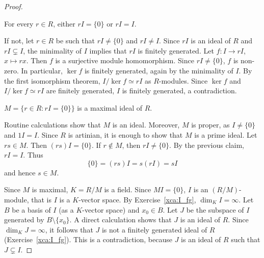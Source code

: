 \begin{graybox}
\begin{proof}
    \begin{claim}
		For every $r\in R$, either $rI=\{0\}$ or $rI=I$.
    \end{claim}
    
    If not, let $r\in R$ be such that $rI\ne\{0\}$ and $rI\ne I$. 
    Since $rI$ is an ideal of $R$ and
    $rI\subsetneq I$, the minimality of $I$ implies that 
    $rI$ is finitely generated. Let 
    $f\colon I\to rI$, $x\mapsto rx$. Then $f$ is a 
    surjective module homomorphism. Since $rI\ne\{0\}$, 
    $f$ is non-zero. In particular, $\ker f$ 
    is finitely generated, again by the minimality of $I$. 
    By the first isomorphism theorem, $I/\ker f\simeq rI$ as $R$-modules.
    Since $\ker f$ and $I/\ker f\simeq rI$ are finitely generated, 
    $I$ is finitely generated, a contradiction.
    
    \begin{claim}
        $M=\{r\in R:rI=\{0\}\}$ is a maximal ideal of $R$. 
    \end{claim}
    
    Routine calculations show that $M$ is an ideal. 
	Moreover, $M$ is proper, as $I\ne\{0\}$ and $1I=I$.
	Since 
    $R$ is artinian, it is enough to show that $M$ is a prime ideal. 
    Let $rs\in M$. Then $(rs)I=\{0\}$. If $r\not\in M$, 
    then $rI\ne\{0\}$. By the previous claim, $rI=I$. Thus
    \[
    \{0\}=(rs)I=s(rI)=sI
    \]
    and hence $s\in M$.     
    
    \medskip
    Since $M$ is maximal, $K=R/M$ is a field. 
    Since $MI=\{0\}$, $I$ is an $(R/M)$-module, that is 
    $I$ is a $K$-vector space. By Exercise~\ref{xca:I_fg}, 
    $\dim_KI=\infty$. Let $B$ be a basis of $I$ (as a $K$-vector space) 
    and $x_0\in B$. Let $J$ be the subspace of $I$ generated by
    $B\setminus\{x_0\}$. A direct calculation
    shows that 
    $J$ is an ideal of $R$.
    Since $\dim_K J=\infty$, it follows that $J$ 
    is not a finitely generated ideal of $R$ 
    (Exercise~\ref{xca:I_fg}). 
    This is a contradiction, because $J$ is an ideal of $R$
    such that $J\subsetneq I$. 
\end{proof}
\end{graybox}